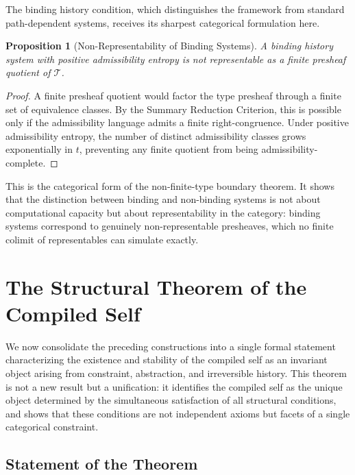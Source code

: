 \documentclass[12pt, a4paper]{article}
\theoremstyle{plain}
\newtheorem{proposition}[theorem]{Proposition}
\theoremstyle{definition}
\theoremstyle{remark}
\begin{document}
The binding history condition, which distinguishes the framework from standard path-dependent systems, receives its sharpest categorical formulation here.

\begin{proposition}[Non-Representability of Binding Systems]
A binding history system with positive admissibility entropy is not representable as a finite presheaf quotient of $\mathcal{T}$.
\end{proposition}

\begin{proof}
A finite presheaf quotient would factor the type presheaf through a finite set of equivalence classes. By the Summary Reduction Criterion, this is possible only if the admissibility language admits a finite right-congruence. Under positive admissibility entropy, the number of distinct admissibility classes grows exponentially in $t$, preventing any finite quotient from being admissibility-complete.
\end{proof}

This is the categorical form of the non-finite-type boundary theorem. It shows that the distinction between binding and non-binding systems is not about computational capacity but about representability in the category: binding systems correspond to genuinely non-representable presheaves, which no finite colimit of representables can simulate exactly.

\section{The Structural Theorem of the Compiled Self}

We now consolidate the preceding constructions into a single formal statement characterizing the existence and stability of the compiled self as an invariant object arising from constraint, abstraction, and irreversible history. This theorem is not a new result but a unification: it identifies the compiled self as the unique object determined by the simultaneous satisfaction of all structural conditions, and shows that these conditions are not independent axioms but facets of a single categorical constraint.

\subsection{Statement of the Theorem}
\end{document}
